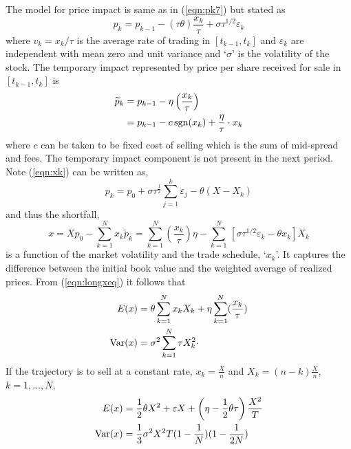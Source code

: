 The model for price impact is same as in (\ref{eqn:pk7}) but stated as
	\begin{equation}\label{eqn:bigpk}
	p_k=p_{k-1} - (\tau\theta)\dfrac{x_k}{\tau} + \sigma\tau^{1/2}\varepsilon_k
	\end{equation}
where $v_k = x_k/\tau$ is the average rate of trading in $[t_{k-1}, t_k]$ and $\varepsilon_k$ are independent with mean zero and unit variance and `$\sigma$' is the volatility of the stock. The temporary impact represented by price per share received for sale in $[t_{k-1}, t_k]$ is
	\begin{equation}\label{eqn:pdouble}
	\begin{split}
	\widetilde{p}_k &= p_{k-1} - \eta\left(\dfrac{x_k}{\tau}\right) \\
			&= p_{k-1} - c \sgn(x_k) + \frac{\eta}{\tau}\cdot x_k
	\end{split}
	\end{equation}
where $c$ can be taken to be fixed cost of selling which is the sum of mid-spread and fees. The temporary impact component is not present in the next period. Note (\ref{eqn:xk}) can be written as,
	\begin{equation}\label{eqn:morepk}
	p_k = p_0 + \sigma\tau^{\frac{1}{2}}\sum_{j=1}^k\varepsilon_j - \theta(X - X_k)
	\end{equation}
and thus the shortfall,
	\begin{equation}\label{eqn:longxeq}
	x = Xp_0 - \sum_{k=1}^N x_k\widetilde{p}_k = \sum_{k=1}^N \left(\frac{x_k}{\tau}\right) \eta - \sum_{k=1}^N \,[\sigma\tau^{1/2}\varepsilon_k - \theta x_k]X_k
	\end{equation}
is a function of the market volatility and the trade schedule, `$x_k$'. It captures the difference between the initial book value and the weighted average of realized prices. From (\ref{eqn:longxeq}) it follows that
	\begin{equation}\label{eqn:evardouble}
	\begin{split}
	E(x) &=  \theta\sum_{k=1}^N x_k X_k + \eta\sum_{k=1}^N (\frac{x_k}{\tau}) \\
	\Var(x) &= \sigma^2\sum_{k=1}^N \tau X_{k}^2\cdot
	\end{split}
	\end{equation}
If the trajectory is to sell at a constant rate, $x_k = \frac{X}{n}$ and $X_k = (n - k)\frac{X}{n}$, $k = 1,\ldots,N$,
	\begin{equation}\label{eqn:secondevardouble}
	\begin{split}
	E(x) &= \frac{1}{2}\theta X^2 + \varepsilon X + \left(\eta - \frac{1}{2}\theta\tau\right)\frac{X^2}{T} \\
	\Var(x) &= \frac{1}{3}\sigma^2X^2T(1 - \frac{1}{N})(1-\frac{1}{2N})
	\end{split}
	\end{equation}
